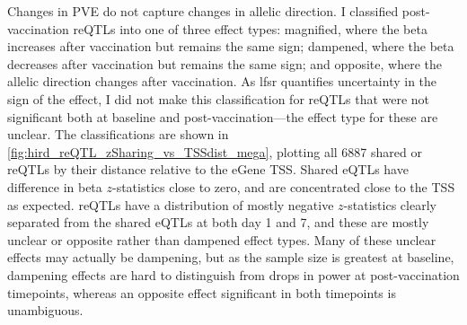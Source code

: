 Changes in \gls{PVE} do not capture changes in allelic direction.
I classified post-vaccination \glspl{reQTL} into one of three effect types:
magnified, where the beta increases after vaccination but remains the same sign;
dampened, where the beta decreases after vaccination but remains the same sign;
and opposite, where the allelic direction changes after vaccination.
As \gls{lfsr} quantifies uncertainty in the sign of the effect, I did not make this classification for \glspl{reQTL} that were not significant both at baseline and post-vaccination---the effect type for these are unclear.
The classifications are shown in \cref{fig:hird_reQTL_zSharing_vs_TSSdist_mega}, plotting all \num{6887} shared or \glspl{reQTL} by their distance relative to the eGene \gls{TSS}.
Shared \glspl{eQTL} have difference in beta $z$-statistics close to zero, and are concentrated close to the \gls{TSS} as expected.
\glspl{reQTL} have a distribution of mostly negative $z$-statistics clearly separated from the shared \glspl{eQTL} at both day 1 and 7,
and these are mostly unclear or opposite rather than dampened effect types.
Many of these unclear effects may actually be dampening, 
but as the sample size is greatest at baseline, 
dampening effects are hard to distinguish from drops in power at post-vaccination timepoints, 
whereas an opposite effect significant in both timepoints is unambiguous.

